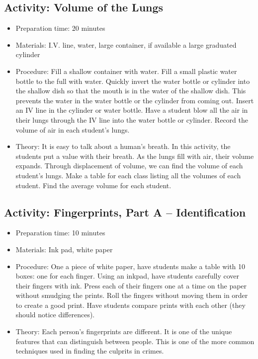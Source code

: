 \subsection{Activity: Volume of the Lungs}
\begin{itemize}
\item{Preparation time: 20 minutes}
\item{Materials: I.V. line, water, large container, if available a large graduated cylinder}
\item{Procedure: Fill a shallow container with water. Fill a small plastic water bottle to the full with water. Quickly invert the water bottle or cylinder into the shallow dish so that the mouth is in the water of the shallow dish. This prevents the water in the water bottle or the cylinder from coming out. Insert an IV line in the cylinder or water bottle. Have a student blow all the air in their lungs through the IV line into the water bottle or cylinder. Record the volume of air in each student’s lungs.}
\item{Theory: It is easy to talk about a human’s breath. In this activity, the students put a value with their breath. As the lungs fill with air, their volume expands. Through displacement of volume, we can find the volume of each student’s lungs. Make a table for each class listing all the volumes of each student. Find the average volume for each student.}
\end{itemize}

\subsection{Activity: Fingerprints, Part A – Identification}
\begin{itemize}
\item{Preparation time: 10 minutes}
\item{Materials: Ink pad, white paper }
\item{Procedure: One a piece of white paper, have students make a table with 10 boxes: one for each finger. Using an inkpad, have students carefully cover their fingers with ink. Press each of their fingers one at a time on the paper without smudging the prints. Roll the fingers without moving them in order to create a good print. Have students compare prints with each other (they should notice differences).}
\item{Theory: Each person’s fingerprints are different. It is one of the unique features that can distinguish between people. This is one of the more common techniques used in finding the culprits in crimes.}
\end{itemize}

